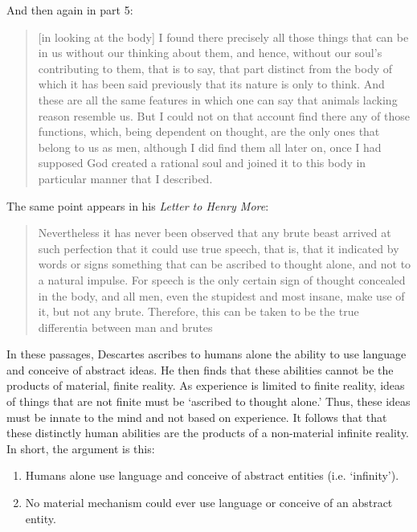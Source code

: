 \begin{refsection}
And then again in part 5:

\begin{quote}

[in looking at the body] I found there precisely all those things that can be in us without our thinking about them, and hence, without our soul's contributing to them, that is to say, that part distinct from the body of which it has been said previously that its nature is only to think. And these are all the same features in which one can say that animals lacking reason resemble us. But I could not on that account find there any of those functions, which, being dependent on thought, are the only ones that belong to us as men, although I did find them all later on, once I had supposed God created a rational soul and joined it to this body in particular manner that I described. ~\citep[Ch 5, 1637]{Descartes:1968uf}
\end{quote}

The same point appears in his \emph{Letter to Henry More}:

\begin{quote}

Nevertheless it has never been observed that any brute beast arrived at such perfection that it could use true speech, that is, that it indicated by words or signs something that can be ascribed to thought alone, and not to a natural impulse. For speech is the only certain sign of thought concealed in the body, and all men, even the stupidest and most insane, make use of it, but not any brute. Therefore, this can be taken to be the true differentia between man and brutes ~\citep[p. 297]{Descartes:ut}
\end{quote}

In these passages, Descartes ascribes to humans alone the ability to use language and conceive of abstract ideas. He then finds that these abilities cannot be the products of material, finite reality. As experience is limited to finite reality, ideas of things that are not finite must be `ascribed to thought alone.' Thus, these ideas must be innate to the mind and not based on experience. It follows that that these distinctly human abilities are the products of a non-material infinite reality. In short, the argument is this:

\begin{enumerate}
\item Humans alone use language and conceive of abstract entities (i.e. `infinity').

\item No material mechanism could ever use language or conceive of an abstract entity.


\end{enumerate}
\end{refsection}
